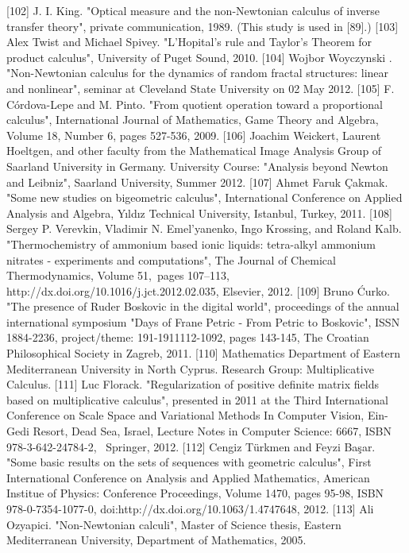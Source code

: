 \documentclass[12pt]{article}
\begin{document}
[102] J. I. King. "Optical measure and the non-Newtonian calculus of inverse transfer theory", private communication, 1989. (This study is used in [89].)
[103] Alex Twist and Michael Spivey. "L'Hopital's rule and Taylor's Theorem for product calculus", University of Puget Sound, 2010.
[104] Wojbor Woyczynski . "Non-Newtonian calculus for the dynamics of random fractal structures: linear and nonlinear", seminar at Cleveland State University on 02 May 2012.
[105] F. Córdova-Lepe and M. Pinto. "From quotient operation toward a proportional calculus", International Journal of Mathematics, Game Theory and Algebra, Volume 18, Number 6, pages 527-536, 2009. 
[106] Joachim Weickert, Laurent Hoeltgen, and other faculty from the Mathematical Image Analysis Group of Saarland University in Germany. University Course: "Analysis beyond Newton and Leibniz", Saarland University, Summer 2012.
[107] Ahmet Faruk Çakmak. "Some new studies on bigeometric calculus", International Conference on Applied Analysis and Algebra, Yıldız Technical University, Istanbul, Turkey, 2011.
[108] Sergey P. Verevkin, Vladimir N. Emel'yanenko, Ingo Krossing, and Roland Kalb. "Thermochemistry of ammonium based ionic liquids: tetra-alkyl ammonium nitrates - experiments and computations", The Journal of Chemical Thermodynamics, Volume 51, pages 107–113, http://dx.doi.org/10.1016/j.jct.2012.02.035, Elsevier, 2012.
[109] Bruno Ćurko. "The presence of Ruder Boskovic in the digital world", proceedings of the annual international symposium "Days of Frane Petric - From Petric to Boskovic", ISSN 1884-2236, project/theme: 191-1911112-1092, pages 143-145, The Croatian Philosophical Society in Zagreb, 2011.
[110] Mathematics Department of Eastern Mediterranean University in North Cyprus. Research Group: Multiplicative Calculus.
[111] Luc Florack. "Regularization of positive definite matrix fields based on multiplicative calculus", presented in 2011 at the Third International Conference on Scale Space and Variational Methods In Computer Vision, Ein-Gedi Resort, Dead Sea, Israel, Lecture Notes in Computer Science: 6667, ISBN 978-3-642-24784-2,  Springer, 2012.
[112] Cengiz Türkmen and Feyzi Başar. "Some basic results on the sets of sequences with geometric calculus", First International Conference on Analysis and Applied Mathematics, American Institue of Physics: Conference Proceedings, Volume 1470, pages 95-98, ISBN 978-0-7354-1077-0, doi:http://dx.doi.org/10.1063/1.4747648, 2012.
[113] Ali Ozyapici. "Non-Newtonian calculi", Master of Science thesis, Eastern Mediterranean University, Department of Mathematics, 2005.
\end{document}
